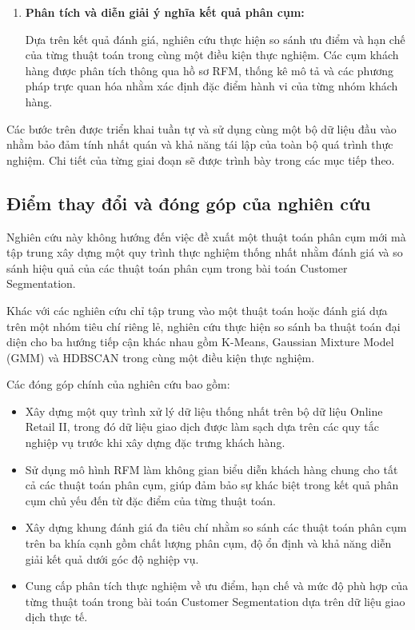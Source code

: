\documentclass[12pt]{ai_conquer2026}
\begin{document}
\begin{enumerate}
\item \textbf{Phân tích và diễn giải ý nghĩa kết quả phân cụm:}

Dựa trên kết quả đánh giá, nghiên cứu thực hiện so sánh ưu điểm và hạn chế của từng thuật toán trong cùng một điều kiện thực nghiệm. Các cụm khách hàng được phân tích thông qua hồ sơ RFM, thống kê mô tả và các phương pháp trực quan hóa nhằm xác định đặc điểm hành vi của từng nhóm khách hàng.

\end{enumerate}

Các bước trên được triển khai tuần tự và sử dụng cùng một bộ dữ liệu đầu vào nhằm bảo đảm tính nhất quán và khả năng tái lập của toàn bộ quá trình thực nghiệm. Chi tiết của từng giai đoạn sẽ được trình bày trong các mục tiếp theo.

\subsection{Điểm thay đổi và đóng góp của nghiên cứu}

Nghiên cứu này không hướng đến việc đề xuất một thuật toán phân cụm mới mà tập trung xây dựng một quy trình thực nghiệm thống nhất nhằm đánh giá và so sánh hiệu quả của các thuật toán phân cụm trong bài toán Customer Segmentation. 

Khác với các nghiên cứu chỉ tập trung vào một thuật toán hoặc đánh giá dựa trên một nhóm tiêu chí riêng lẻ, nghiên cứu thực hiện so sánh ba thuật toán đại diện cho ba hướng tiếp cận khác nhau gồm K-Means, Gaussian Mixture Model (GMM) và HDBSCAN trong cùng một điều kiện thực nghiệm.

Các đóng góp chính của nghiên cứu bao gồm:

\begin{itemize}

    \item Xây dựng một quy trình xử lý dữ liệu thống nhất trên bộ dữ liệu Online Retail II, trong đó dữ liệu giao dịch được làm sạch dựa trên các quy tắc nghiệp vụ trước khi xây dựng đặc trưng khách hàng.

    \item Sử dụng mô hình RFM làm không gian biểu diễn khách hàng chung cho tất cả các thuật toán phân cụm, giúp đảm bảo sự khác biệt trong kết quả phân cụm chủ yếu đến từ đặc điểm của từng thuật toán.

    \item Xây dựng khung đánh giá đa tiêu chí nhằm so sánh các thuật toán phân cụm trên ba khía cạnh gồm chất lượng phân cụm, độ ổn định và khả năng diễn giải kết quả dưới góc độ nghiệp vụ.

    \item Cung cấp phân tích thực nghiệm về ưu điểm, hạn chế và mức độ phù hợp của từng thuật toán trong bài toán Customer Segmentation dựa trên dữ liệu giao dịch thực tế.

\end{itemize}
\end{document}
